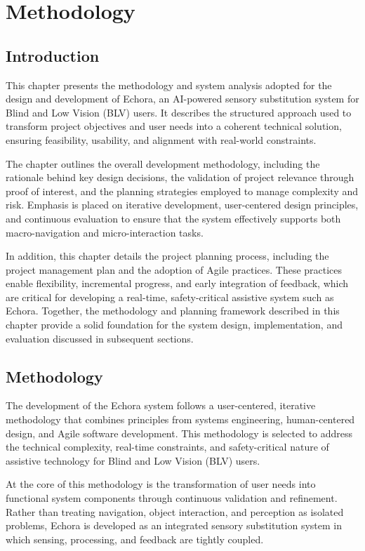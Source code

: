\chapter{Methodology}
\label{ch:methodology}

\section{Introduction}

This chapter presents the methodology and system analysis adopted for the design and development of Echora, an AI-powered sensory substitution system for Blind and Low Vision (BLV) users. It describes the structured approach used to transform project objectives and user needs into a coherent technical solution, ensuring feasibility, usability, and alignment with real-world constraints.

The chapter outlines the overall development methodology, including the rationale behind key design decisions, the validation of project relevance through proof of interest, and the planning strategies employed to manage complexity and risk. Emphasis is placed on iterative development, user-centered design principles, and continuous evaluation to ensure that the system effectively supports both macro-navigation and micro-interaction tasks.

In addition, this chapter details the project planning process, including the project management plan and the adoption of Agile practices. These practices enable flexibility, incremental progress, and early integration of feedback, which are critical for developing a real-time, safety-critical assistive system such as Echora. Together, the methodology and planning framework described in this chapter provide a solid foundation for the system design, implementation, and evaluation discussed in subsequent sections.

\section{Methodology}

The development of the Echora system follows a user-centered, iterative methodology that combines principles from systems engineering, human-centered design, and Agile software development. This methodology is selected to address the technical complexity, real-time constraints, and safety-critical nature of assistive technology for Blind and Low Vision (BLV) users.

At the core of this methodology is the transformation of user needs into functional system components through continuous validation and refinement. Rather than treating navigation, object interaction, and perception as isolated problems, Echora is developed as an integrated sensory substitution system in which sensing, processing, and feedback are tightly coupled.

